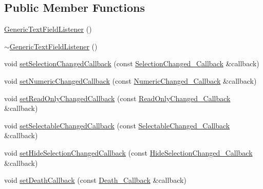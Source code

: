 \subsection*{Public Member Functions}
\begin{DoxyCompactItemize}
\item 
\mbox{\hyperlink{classec_1_1_generic_text_field_listener_aa4b7df86e1542d6edeb26f256d244e33}{Generic\+Text\+Field\+Listener}} ()
\item 
\mbox{\hyperlink{classec_1_1_generic_text_field_listener_a356f614d1d7d3613feb111e9c81f53ce}{$\sim$\+Generic\+Text\+Field\+Listener}} ()
\item 
void \mbox{\hyperlink{classec_1_1_generic_text_field_listener_aea5a7265627003b41e3a74744a1251d6}{set\+Selection\+Changed\+Callback}} (const \mbox{\hyperlink{classec_1_1_generic_text_field_listener_aa25985c5297422833dc4f5395562f238}{Selection\+Changed\+\_\+\+Callback}} \&callback)
\item 
void \mbox{\hyperlink{classec_1_1_generic_text_field_listener_a8a0019de3e5f93946c16cb345db72eb6}{set\+Numeric\+Changed\+Callback}} (const \mbox{\hyperlink{classec_1_1_generic_text_field_listener_a812d274699c302784f844242b07b4f0b}{Numeric\+Changed\+\_\+\+Callback}} \&callback)
\item 
void \mbox{\hyperlink{classec_1_1_generic_text_field_listener_a0b975294290a4d19b8cbdcfdeefd5b2c}{set\+Read\+Only\+Changed\+Callback}} (const \mbox{\hyperlink{classec_1_1_generic_text_field_listener_aca96f31990936c2284b510bc4636b08b}{Read\+Only\+Changed\+\_\+\+Callback}} \&callback)
\item 
void \mbox{\hyperlink{classec_1_1_generic_text_field_listener_a7a6ea1a36fe3f3a6a35be2029f4f38d7}{set\+Selectable\+Changed\+Callback}} (const \mbox{\hyperlink{classec_1_1_generic_text_field_listener_afa761f962b7fb681d7d9d29a132f800e}{Selectable\+Changed\+\_\+\+Callback}} \&callback)
\item 
void \mbox{\hyperlink{classec_1_1_generic_text_field_listener_aedc528aad9dae07e00d2e19bfe68d655}{set\+Hide\+Selection\+Changed\+Callback}} (const \mbox{\hyperlink{classec_1_1_generic_text_field_listener_a1a1f11d8e8c473760260f7ed5cacb458}{Hide\+Selection\+Changed\+\_\+\+Callback}} \&callback)
\item 
void \mbox{\hyperlink{classec_1_1_generic_text_field_listener_aaf8af37a52886c8551d0035fb99a54de}{set\+Death\+Callback}} (const \mbox{\hyperlink{classec_1_1_generic_text_field_listener_a720d56c97f2ac11e2658db516b186d4f}{Death\+\_\+\+Callback}} \&callback)
\item 

\end{DoxyCompactItemize}
